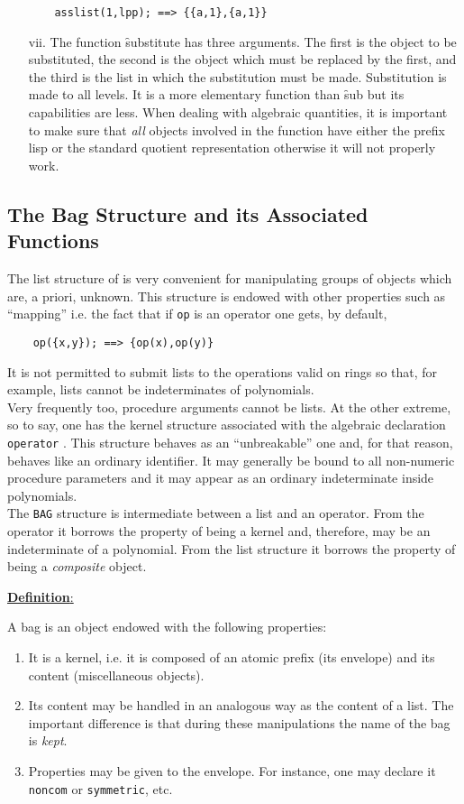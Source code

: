 \begin{itemize}
\begin{verbatim}
    asslist(1,lpp); ==> {{a,1},{a,1}}
\end{verbatim}
\item[vii.]
\hypertarget{operator:SUBSTITUTE}{}
The function \f{substitute} has three arguments. The first
is the object to be substituted, the second is the object which must be
replaced by the first, and the third is the list in which the substitution 
must be made. Substitution is made to
all levels. It is a more elementary function than \f{sub} but its
capabilities are less. When dealing with algebraic quantities, it is
important to make sure that \emph{all} objects involved in the function
have either the prefix lisp or the standard quotient representation
otherwise it will not properly work.
\end{itemize}
\subsection{ The Bag Structure and its Associated Functions}
The list structure of \REDUCE is very convenient for manipulating
groups of objects which are, a priori, unknown. This structure is
endowed with other properties such as ``mapping'' i.e. the fact that
if \texttt{op} is an operator one gets, by default,
\begin{verbatim}
    op({x,y}); ==> {op(x),op(y)}
\end{verbatim}
It is not permitted to submit lists to the operations valid on rings
so that, for example, lists cannot be indeterminates of polynomials.\\
Very frequently too, procedure arguments cannot be lists.
At the other extreme, so to say, one has the kernel
structure associated
with the algebraic declaration \texttt{operator} .  This structure behaves as
an ``unbreakable'' one and, for that reason, behaves
like an ordinary identifier.
It may generally be bound to all non-numeric procedure parameters
and it may appear
as an ordinary indeterminate inside polynomials. \\
The \texttt{BAG} structure is intermediate between a list and an operator.
From the operator it borrows the property of being a kernel and,
therefore, may be an indeterminate of a polynomial. From the list structure
it borrows the property of being a \emph{composite} object.

\underline{\textbf{Definition}:}

A bag is an object endowed with the following properties:
\begin{enumerate}
\item It is a kernel, i.e. it is composed of an atomic prefix (its
envelope) and
its content (miscellaneous objects).
\item Its content may be handled in an analogous way as the content of a
list. The important difference is that during these manipulations 
the name of the bag is \emph{kept}.
\item Properties may be given to the envelope. For instance, one may
declare it \texttt{noncom} or \texttt{symmetric}, etc.
\end{enumerate}

